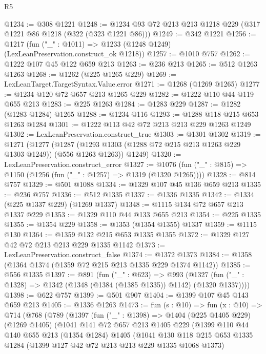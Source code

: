 \begin{lexlean}{R5}
\begin{coremodule}
@1234 := @308 @1221
@1248 := @1234 @93 @72 @213 @213 @1218 @229 (@317 @1221 @86 @1218 (@322 (@323 @1221 @86)))
@1249 := @342 @1221
@1256 := @1217 (fun ("_" : @1011) => @1233 (@1248 @1249) (LexLeanPreservation.construct_ok @1218))
@1257 := @1010 @757
@1262 := @1222 @107 @45 @122 @659 @213
@1263 := @236 @213
@1265 := @512 @1263 @1263
@1268 := @1262 (@225 @1265 @229)
@1269 := LexLeanTarget.TargetSyntax.Value.error
@1271 := @1268 (@1269 @1265)
@1277 := @1234 @120 @72 @657 @213 @1265 @229
@1282 := @1222 @110 @44 @119 @655 @213
@1283 := @225 @1263
@1284 := @1283 @229
@1287 := @1282 (@1283 @1284) @1265
@1288 := @1234 @116
@1293 := @1288 @118 @215 @653 @1263 @1284
@1301 := @1222 @113 @42 @72 @213 @213 @229 @1263 @1249
@1302 := LexLeanPreservation.construct_true
@1303 := @1301 @1302
@1319 := @1271
    (@1277
      (@1287 (@1293 @1303 (@1288 @72 @215 @213 @1263 @229 @1303 @1249)) (@556 @1263 @1263))
      @1249)
@1320 := LexLeanPreservation.construct_error
@1327 := @1076 (fun ("_" : @815) => @1150 (@1256 (fun ("_" : @1257) => @1319 (@1320 @1265))))
@1328 := @814 @757
@1329 := @501 @1088
@1334 := @1329 @107 @45 @136 @659 @213
@1335 := @236 @757
@1336 := @512 @1335
@1337 := @1336 @1335
@1342 := @1334 (@225 @1337 @229) (@1269 @1337)
@1348 := @1115 @134 @72 @657 @213 @1337 @229
@1353 := @1329 @110 @44 @133 @655 @213
@1354 := @225 @1335
@1355 := @1354 @229
@1358 := @1353 (@1354 @1355) @1337
@1359 := @1115 @130
@1364 := @1359 @132 @215 @653 @1335 @1355
@1372 := @1329 @127 @42 @72 @213 @213 @229 @1335 @1142
@1373 := LexLeanPreservation.construct_false
@1374 := @1372 @1373
@1384 := @1358 (@1364 @1374 (@1359 @72 @215 @213 @1335 @229 @1374 @1142))
@1385 := @556 @1335
@1397 := @891
    (fun ("_" : @623) =>
    @993 (@1327 (fun ("_" : @1328) => @1342 (@1348 (@1384 (@1385 @1335)) @1142) (@1320 @1337))))
@1398 := @622 @757
@1399 := @501 @907
@1404 := @1399 @107 @45 @143 @659 @213
@1405 := @1336 @1263
@1473 := fun (s : @10) =>
  fun (x : @10) =>
  @714
    (@768
      (@789
        (@1397
          (fun ("_" : @1398) =>
          @1404
            (@225 @1405 @229)
            (@1269 @1405)
            (@1041
              @141
              @72
              @657
              @213
              @1405
              @229
              (@1399
                @110
                @44
                @140
                @655
                @213
                (@1354 @1284)
                @1405
                (@1041
                  @130
                  @118
                  @215
                  @653
                  @1335
                  @1284
                  (@1399 @127 @42 @72 @213 @213 @229 @1335 @1068 @1373)

\end{coremodule}
\end{lexlean}
